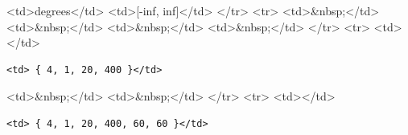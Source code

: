 \textless{}td\textgreater{}degrees\textless{}/td\textgreater{} \textless{}td\textgreater{}[-inf, inf]\textless{}/td\textgreater{} \textless{}/tr\textgreater{} \textless{}tr\textgreater{} \textless{}td\textgreater{}\&nbsp;\textless{}/td\textgreater{} \textless{}td\textgreater{}\&nbsp;\textless{}/td\textgreater{} \textless{}td\textgreater{}\&nbsp;\textless{}/td\textgreater{} \textless{}td\textgreater{}\&nbsp;\textless{}/td\textgreater{} \textless{}/tr\textgreater{} \textless{}tr\textgreater{} \textless{}td\textgreater{}\textless{}/td\textgreater{}

\begin{verbatim}
<td> { 4, 1, 20, 400 }</td>
\end{verbatim}

\textless{}td\textgreater{}\&nbsp;\textless{}/td\textgreater{} \textless{}td\textgreater{}\&nbsp;\textless{}/td\textgreater{} \textless{}/tr\textgreater{} \textless{}tr\textgreater{} \textless{}td\textgreater{}\textless{}/td\textgreater{}

\begin{verbatim}
<td> { 4, 1, 20, 400, 60, 60 }</td>
\end{verbatim}

